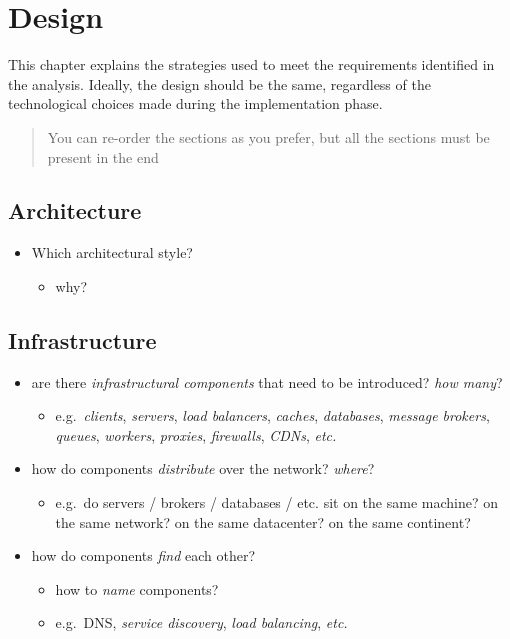 \documentclass{scrartcl}
\begin{document}
\section{Design}\label{design}

This chapter explains the strategies used to meet the requirements
identified in the analysis. Ideally, the design should be the same,
regardless of the technological choices made during the implementation
phase.

\begin{quote}
You can re-order the sections as you prefer, but all the sections must
be present in the end
\end{quote}

\subsection{Architecture}\label{architecture}

\begin{itemize}
  \item Which architectural style?

  \begin{itemize}
    \item why?
  \end{itemize}
\end{itemize}

\subsection{Infrastructure}\label{infrastructure}

\begin{itemize}
  \item are there \emph{infrastructural components} that need to be
  introduced? \emph{how many}?

  \begin{itemize}
    \item e.g.~\emph{clients}, \emph{servers}, \emph{load balancers},
    \emph{caches}, \emph{databases}, \emph{message brokers},
    \emph{queues}, \emph{workers}, \emph{proxies}, \emph{firewalls},
    \emph{CDNs}, \emph{etc.}
  \end{itemize}
  \item how do components \emph{distribute} over the network? \emph{where}?

  \begin{itemize}
    \item e.g.~do servers / brokers / databases / etc. sit on the same
    machine? on the same network? on the same datacenter? on the same
    continent?
  \end{itemize}
  \item how do components \emph{find} each other?

  \begin{itemize}
    \item how to \emph{name} components?
    \item e.g.~DNS, \emph{service discovery}, \emph{load balancing},
    \emph{etc.}
  \end{itemize}
\end{itemize}
\end{document}
